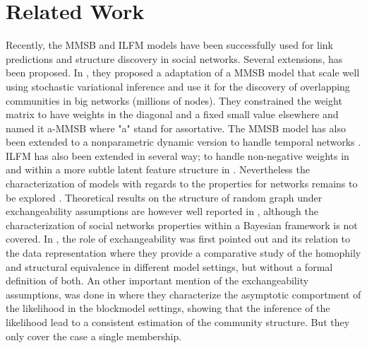\section{Related Work}



Recently, the MMSB \cite{MMSB} and ILFM \cite{ILFM} models have been successfully used for link predictions and structure discovery in social networks. Several extensions, has been proposed. In \cite{AMMSB}, they proposed a adaptation of a MMSB model that scale well using stochastic variational inference and use it for the discovery of overlapping communities in big networks (millions of nodes). They constrained the weight matrix to have weights in the diagonal and a fixed small value elsewhere and named it a-MMSB where "a" stand for assortative. The MMSB model has also been extended to a nonparametric dynamic version to handle temporal networks \cite{fan2015dynamic}. ILFM has also been extended in several way; to handle non-negative weights in \cite{IMRM} and within a more subtle latent feature structure in \cite{ILAM}. Nevertheless the characterization of models with regards to the properties for networks remains to be explored \cite{jacobs2014unified}. Theoretical results on the structure of random graph under exchangeability assumptions are however well reported in \cite{orbanz2015bayesian}, although the characterization of social networks properties within a Bayesian framework is not covered. In \cite{hoff2008modeling}, the role of exchangeability was first pointed out and its relation to the data representation where they provide a comparative study of the homophily and structural equivalence in different model settings, but without a formal definition of both. An other important mention of the exchangeability assumptions, was done in \cite{bickel2009nonparametric} where they characterize the asymptotic comportment of the likelihood in the blockmodel settings, showing that the inference of the likelihood lead to a consistent estimation of the community structure. But they only cover the case a single membership.

